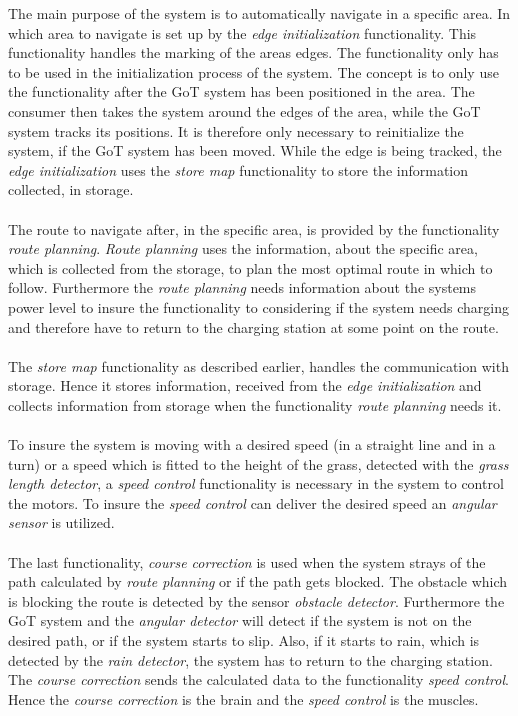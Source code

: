\noindent
The main purpose of the system is to automatically navigate in a specific area. In which area to navigate is set up by the \textit{edge initialization} functionality. This functionality handles the marking of the areas edges. The functionality only has to be used in the initialization process of the system. The concept is to only use the functionality after the GoT system has been positioned in the area. The consumer then takes the system around the edges of the area, while the GoT system tracks its positions. It is therefore only necessary to reinitialize the system, if the GoT system has been moved. While the edge is being tracked, the \textit{edge initialization} uses the \textit{store map} functionality to store the information collected, in storage. \\\\ 
\noindent
The route to navigate after, in the specific area, is provided by the functionality \textit{route planning}. \textit{Route planning} uses the information, about the specific area, which is collected from the storage, to plan the most optimal route in which to follow. Furthermore the \textit{route planning} needs information about the systems power level to insure the functionality to considering if the system needs charging and therefore have to return to the charging station at some point on the route.\\\\
\noindent
The \textit{store map} functionality as described earlier, handles the communication with storage. Hence it stores information, received from the \textit{edge initialization} and collects information from storage when the functionality \textit{route planning} needs it. \\\\
\noindent
To insure the system is moving with a desired speed (in a straight line and in a turn) or a speed which is fitted to the height of the grass, detected with the \textit{grass length detector}, a \textit{speed control} functionality is necessary in the system to control the motors. To insure the \textit{speed control} can deliver the desired speed an \textit{angular sensor} is utilized. \\\\
\noindent
The last functionality, \textit{course correction} is used when the system strays of the path calculated by \textit{route planning} or if the path gets blocked.
The obstacle which is blocking the route is detected by the sensor \textit{obstacle detector}. Furthermore the GoT system and the \textit{angular detector} will detect if the system is not on the desired path, or if the system starts to slip. Also, if it starts to rain, which is detected by the \textit{rain detector}, the system has to return to the charging station.
The \textit{course correction} sends the calculated data to the functionality \textit{speed control}. Hence the \textit{course correction} is the brain and the \textit{speed control} is the muscles.\\\\
